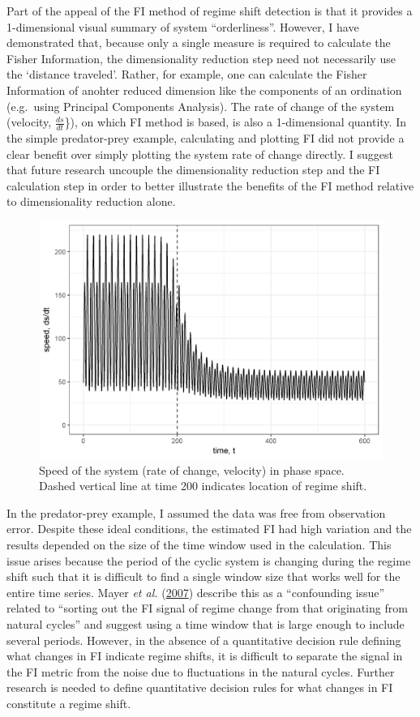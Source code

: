 \documentclass[12pt,twoside,openany]{reedthesis}
\begin{document}
Part of the appeal of the FI method of regime shift detection is that it provides a 1-dimensional visual summary of system ``orderliness''. However, I have demonstrated that, because only a single measure is required to calculate the Fisher Information, the dimensionality reduction step need not necessarily use the `distance traveled'. Rather, for example, one can calculate the Fisher Information of anohter reduced dimension like the components of an ordination (e.g.~using Principal Components Analysis). The rate of change of the system (velocity, \(\frac{ds}{dt}\)\}), on which FI method is based, is also a 1-dimensional quantity. In the simple predator-prey example, calculating and plotting FI did not provide a clear benefit over simply plotting the system rate of change directly. I suggest that future research uncouple the dimensionality reduction step and the FI calculation step in order to better illustrate the benefits of the FI method relative to dimensionality reduction alone.
\begin{figure}
\includegraphics[width=0.95\linewidth]{./chapterFiles/fiGuide/figures/dsdtOverTime} \caption{Speed of the system (rate of change, velocity) in phase space. Dashed vertical line at time 200 indicates location of regime shift.}\label{fig:dsdtOverTime}
\end{figure}
In the predator-prey example, I assumed the data was free from observation error. Despite these ideal conditions, the estimated FI had high variation and the results depended on the size of the time window used in the calculation. This issue arises because the period of the cyclic system is changing during the regime shift such that it is difficult to find a single window size that works well for the entire time series. Mayer \emph{et al.} (\protect\hyperlink{ref-mayer_applications_2007}{2007}) describe this as a ``confounding issue'' related to ``sorting out the FI signal of regime change from that originating from natural cycles'' and suggest using a time window that is large enough to include several periods. However, in the absence of a quantitative decision rule defining what changes in FI indicate regime shifts, it is difficult to separate the signal in the FI metric from the noise due to fluctuations in the natural cycles. Further research is needed to define quantitative decision rules for what changes in FI constitute a regime shift.
\end{document}
